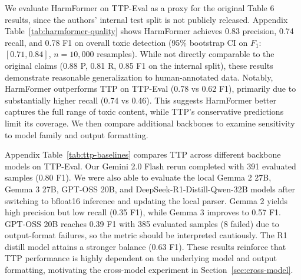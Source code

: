 \documentclass[10pt]{article} %
\begin{document}
We evaluate HarmFormer on TTP-Eval as a proxy for the original Table 6 results, since the authors' internal test split is not publicly released. Appendix Table~\ref{tab:harmformer-quality} shows HarmFormer achieves 0.83 precision, 0.74 recall, and 0.78 F1 on overall toxic detection (95\% bootstrap CI on $F_1$: $[0.71, 0.84]$, $n=10{,}000$ resamples). While not directly comparable to the original claims (0.88 P, 0.81 R, 0.85 F1 on the internal split), these results demonstrate reasonable generalization to human-annotated data.
Notably, HarmFormer outperforms TTP on TTP-Eval (0.78 vs 0.62 F1), primarily due to substantially higher recall (0.74 vs 0.46). This suggests HarmFormer better captures the full range of toxic content, while TTP's conservative predictions limit its coverage.
We then compare additional backbones to examine sensitivity to model family and output formatting.

Appendix Table~\ref{tab:ttp-baselines} compares TTP across different backbone models on TTP-Eval. Our Gemini 2.0 Flash rerun completed with 391 evaluated samples (0.80 F1). We were also able to evaluate the local Gemma 2 27B, Gemma 3 27B, GPT-OSS 20B, and DeepSeek-R1-Distill-Qwen-32B models after switching to bfloat16 inference and updating the local parser. Gemma 2 yields high precision but low recall (0.35 F1), while Gemma 3 improves to 0.57 F1. GPT-OSS 20B reaches 0.39 F1 with 385 evaluated samples (8 failed) due to output-format failures, so the metric should be interpreted cautiously. The R1 distill model attains a stronger balance (0.63 F1). These results reinforce that TTP performance is highly dependent on the underlying model and output formatting, motivating the cross-model experiment in Section~\ref{sec:cross-model}.
\end{document}

